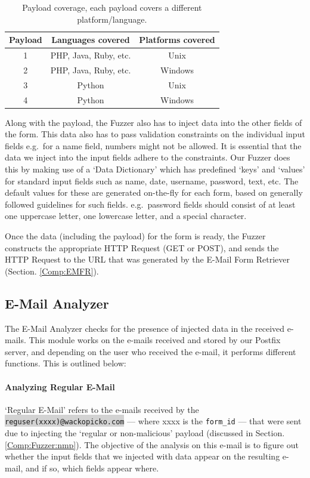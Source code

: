 \begin{table}[!htbp]
	\centering
	\begin{tabular}{|c|c|c|}
		\hline
		\multicolumn{1}{|c|}{\textbf{Payload}} & \multicolumn{1}{c}{\textbf{Languages covered}} & \multicolumn{1}{|c|}{\textbf{Platforms covered}}\\
		\hline
		1 & PHP, Java, Ruby, etc. & Unix\\
		\hline
		2 & PHP, Java, Ruby, etc. & Windows\\
		\hline
		3 & Python & Unix\\
		\hline
		4 & Python & Windows\\
		\hline
	\end{tabular}
	\caption[]{Payload coverage, each payload covers a different platform/language.}
	\label{tab:payloadcov}
\end{table}
Along with the payload, the Fuzzer also has to inject data into the other fields of the form. This data also has to pass validation constraints on the individual input fields e.g.\ for a name field, numbers might not be allowed. It is essential that the data we inject into the input fields adhere to the constraints. Our Fuzzer does this by making use of a `Data Dictionary' which has predefined `keys' and `values' for standard input fields such as name, date, username, password, text, etc. The default values for these are generated on-the-fly for each form, based on generally followed guidelines for such fields. e.g.\ password fields should consist of at least one uppercase letter, one lowercase letter, and a special character.

Once the data (including the payload) for the form is ready, the Fuzzer constructs the appropriate HTTP Request (GET or POST), and sends the HTTP Request to the URL that was generated by the E-Mail Form Retriever (Section. \ref{Comp:EMFR}). 


\subsection{E-Mail Analyzer}
\label{Comp:EMA}
The E-Mail Analyzer checks for the presence of injected data in the received e-mails. This module works on the e-mails received and stored by our Postfix server, and depending on the user who received the e-mail, it performs different functions. This is outlined below:
\paragraph{Analyzing Regular E-Mail}
`Regular E-Mail' refers to the e-mails received by the \colorbox{lightgray}{\lstinline{reguser(xxxx)@wackopicko.com}} --- where xxxx is the \lstinline{form_id} --- that were sent due to injecting the `regular or non-malicious' payload (discussed in Section. \ref{Comp:Fuzzer:nmp}). The objective of the analysis on this e-mail is to figure out whether the input fields that we injected with data appear on the resulting e-mail, and if so, which fields appear where.

